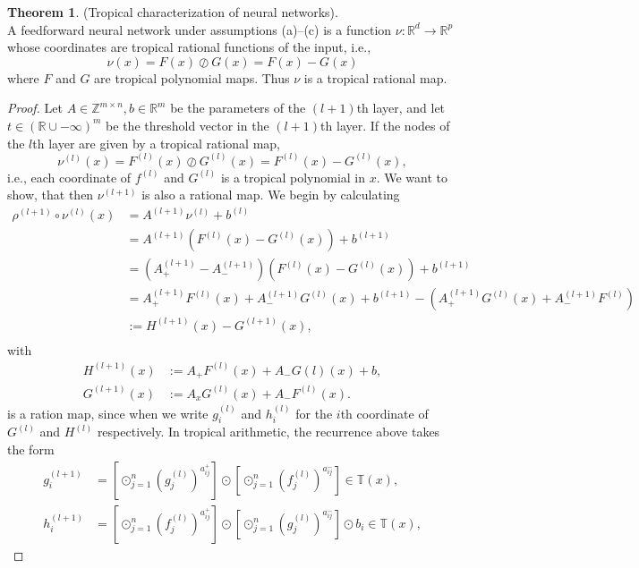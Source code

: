 \documentclass{article}
\theoremstyle{definition}
\newtheorem{theorem}{Theorem}[section]
\begin{document}
\begin{theorem}
\label{teo:trop_char_of_neur_net}
(Tropical characterization of neural networks). \\
A feedforward neural network under assumptions (a)–(c)
is a function $\nu : \mathbb{R}^{d} \to \mathbb{R}^{p}$ whose coordinates are tropical rational functions of the input, i.e.,
$$ \nu(x) = F(x) \oslash G(x) = F(x) - G(x) $$
where $F$ and $G$ are tropical polynomial maps. Thus $\nu$ is a tropical rational map.
\end{theorem}
\begin{proof}
Let $A \in \mathbb{Z}^{m \times n}, b \in \mathbb{R}^{m}$ be the parameters of the $(l+1)$th layer, and let $t \in (\mathbb{R} \cup {- \infty})^{m}$ be the threshold vector in the $(l+1)$th layer. If the nodes of the $l$th layer are given by a tropical rational map,
$$ \nu^{(l)}(x) = F^{(l)}(x) \oslash G^{(l)}(x) = F^{(l)}(x)-G^{(l)}(x),$$
i.e., each coordinate of $f^{(l)}$ and $G^{(l)}$ is a tropical polynomial in $x$. We want to show, that then $\nu^{(l+1)}$ is also a rational map. We begin by calculating
\begin{align*}
\rho^{(l+1)} \circ \nu^{(l)}(x)
&= A^{(l+1)} \nu^{(l)} + b^{(l)} \\
&= A^{(l+1)}(F^{(l)}(x) - G^{(l)}(x)) + b^{(l+1)} \\
&=(A^{(l+1)}_{+} - A^{(l+1)}_{-})(F^{(l)}(x) - G^{(l)}(x)) + b^{(l+1)} \\
&=A_{+}^{(l+1)}F^{(l)}(x) + A_{-}^{(l+1)}G^{(l)}(x) + b^{(l+1)} - (A_{+}^{(l+1)}G^{(l)}(x) + A_{-}^{(l+1)}F^{(l)})\\
&:=  H^{(l+1)}(x) - G^{(l+1)}(x), \\
\end{align*}
with
\begin{align*}
H^{(l+1)}(x) &:= A_{+}F^{(l)}(x) + A_{-}G{(l)}(x) +b, \\
G^{(l+1)}(x) &:= A_{x}G^{(l)}(x) + A_{-}F^{(l)}(x).
\end{align*}
is a ration map, since when we write $g_{i}^{(l)}$ and $h_{i}^{(l)}$ for the $i$th coordinate of $G^{(l)}$ and $H^{(l)}$ respectively. In tropical arithmetic, the recurrence above takes the form
\begin{align*}
g_{i}^{(l+1)} &= [\odot^{n}_{j=1}(g_j^{(l)})^{a_{ij}^{+}}] \odot [\odot^{n}_{j=1}(f_j^{(l)})^{a_{ij}^{-}}] \in \mathbb{T}(x), \\
h_{i}^{(l+1)} &= [\odot^{n}_{j=1}(f_j^{(l)})^{a_{ij}^{+}}] \odot [\odot^{n}_{j=1}(g_j^{(l)})^{a_{ij}^{-}}] \odot b_{i} \in \mathbb{T}(x),
\end{align*}

\end{proof}
\end{document}
